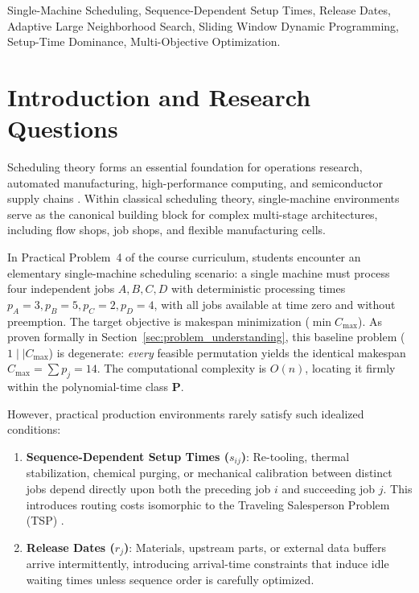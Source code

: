 \documentclass[journal]{IEEEtran}
\begin{document}
\begin{IEEEkeywords}
Single-Machine Scheduling, Sequence-Dependent Setup Times, Release Dates, Adaptive Large Neighborhood Search, Sliding Window Dynamic Programming, Setup-Time Dominance, Multi-Objective Optimization.
\end{IEEEkeywords}

\section{Introduction and Research Questions}
\label{sec:intro}

Scheduling theory forms an essential foundation for operations research, automated manufacturing, high-performance computing, and semiconductor supply chains \cite{pinedo2016scheduling}. Within classical scheduling theory, single-machine environments serve as the canonical building block for complex multi-stage architectures, including flow shops, job shops, and flexible manufacturing cells.

In Practical Problem~4 of the course curriculum, students encounter an elementary single-machine scheduling scenario: a single machine must process four independent jobs $A, B, C, D$ with deterministic processing times $p_A = 3, p_B = 5, p_C = 2, p_D = 4$, with all jobs available at time zero and without preemption. The target objective is makespan minimization ($\min C_{\max}$). As proven formally in Section~\ref{sec:problem_understanding}, this baseline problem ($1 \mid\mid C_{\max}$) is degenerate: \textit{every} feasible permutation yields the identical makespan $C_{\max} = \sum p_j = 14$. The computational complexity is $O(n)$, locating it firmly within the polynomial-time class $\mathbf{P}$.

However, practical production environments rarely satisfy such idealized conditions:
\begin{enumerate}
    \item \textbf{Sequence-Dependent Setup Times ($s_{ij}$)}: Re-tooling, thermal stabilization, chemical purging, or mechanical calibration between distinct jobs depend directly upon both the preceding job $i$ and succeeding job $j$. This introduces routing costs isomorphic to the Traveling Salesperson Problem (TSP) \cite{garey1979computers}.
    \item \textbf{Release Dates ($r_j$)}: Materials, upstream parts, or external data buffers arrive intermittently, introducing arrival-time constraints that induce idle waiting times unless sequence order is carefully optimized.
\end{enumerate}
\end{document}
